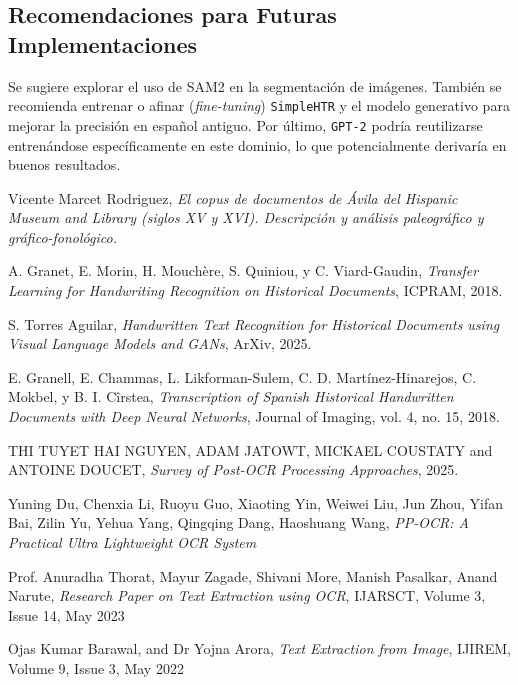 \documentclass[11pt,a4paper]{article}
\begin{document}
\subsection{Recomendaciones para Futuras Implementaciones}

Se sugiere explorar el uso de SAM2 en la segmentación de imágenes. También se recomienda entrenar o afinar (\textit{fine-tuning}) \texttt{SimpleHTR} y el modelo generativo para mejorar la precisión en español antiguo. Por último, \texttt{GPT-2} podría reutilizarse entrenándose específicamente en este dominio, lo que potencialmente derivaría en buenos resultados.

 


\begin{thebibliography}{9}

    Vicente Marcet Rodriguez,
    \textit{El copus de documentos de \'Avila del Hispanic Museum and Library (siglos XV y XVI). Descripci\'on y an\'alisis paleogr\'afico y gr\'afico-fonol\'ogico.}

    A. Granet, E. Morin, H. Mouchère, S. Quiniou, y C. Viard-Gaudin, 
    \textit{Transfer Learning for Handwriting Recognition on Historical Documents}, 
    ICPRAM, 2018.
    
    S. Torres Aguilar, 
    \textit{Handwritten Text Recognition for Historical Documents using Visual Language Models and GANs}, 
    ArXiv, 2025.
    
    E. Granell, E. Chammas, L. Likforman-Sulem, C. D. Martínez-Hinarejos, C. Mokbel, y B. I. Cîrstea, 
    \textit{Transcription of Spanish Historical Handwritten Documents with Deep Neural Networks}, 
    Journal of Imaging, vol. 4, no. 15, 2018.
    
    THI TUYET HAI NGUYEN, ADAM JATOWT, MICKAEL COUSTATY and ANTOINE DOUCET,
    \textit{Survey of Post-OCR Processing Approaches}, 
    2025.

    Yuning Du, Chenxia Li, Ruoyu Guo, Xiaoting Yin, Weiwei Liu,
    Jun Zhou, Yifan Bai, Zilin Yu, Yehua Yang, Qingqing Dang, Haoshuang Wang,
    \textit{PP-OCR: A Practical Ultra Lightweight OCR System}
    
    Prof. Anuradha Thorat, Mayur Zagade, Shivani More, Manish Pasalkar, Anand Narute,
    \textit{Research Paper on Text Extraction using OCR}, 
    IJARSCT, Volume 3, Issue 14, May 2023

    Ojas Kumar Barawal, and Dr Yojna Arora,
    \textit{Text Extraction from Image}, 
    IJIREM, Volume 9, Issue 3, May 2022

\end{thebibliography}
\end{document}

